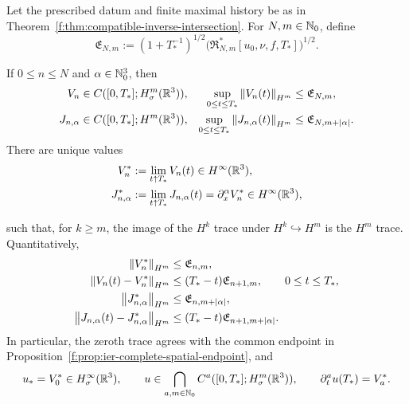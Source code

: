\begin{theorem}
\label{f:thm:ier-compatible-endpoint-traces}
Let the prescribed datum and finite maximal history be as in
Theorem~\ref{f:thm:compatible-inverse-intersection}.
For \(N,m\in\mathbb N_0\), define
\begin{equation}
 \mathfrak E_{N,m}
 :=(1+T_*^{-1})^{1/2}
 \bigl(\mathfrak R_{N,m}^*[u_0,\nu,f,T_*]\bigr)^{1/2}.
 \label{f:eq:ier-endpoint-majorant}
\end{equation}
\begin{samepage}
If \(0\le n\le N\) and \(\alpha\in\mathbb N_0^3\), then
\begin{align}
 V_n&\in C([0,T_*];H^m_\sigma(\mathbb R^3)),
 &\sup_{0\le t\le T_*}\left\lVert V_n(t)\right\rVert_{H^m}
 &\le\mathfrak E_{N,m},
 \label{f:eq:ier-row-trace}\\
 J_{n,\alpha}&\in C([0,T_*];H^m(\mathbb R^3)),
 &\sup_{0\le t\le T_*}\left\lVert J_{n,\alpha}(t)\right\rVert_{H^m}
 &\le\mathfrak E_{N,m+|\alpha|}.
 \label{f:eq:ier-mixed-row-trace}
\end{align}
There are unique values
\begin{align}
 V_n^*&:=\lim_{t\uparrow T_*}V_n(t)
 \in H^\infty(\mathbb R^3),
 \label{f:eq:ier-velocity-endpoint}\\
 J_{n,\alpha}^*&:=\lim_{t\uparrow T_*}J_{n,\alpha}(t)
 =\partial_x^\alpha V_n^*
 \in H^\infty(\mathbb R^3),
 \label{f:eq:ier-mixed-velocity-endpoint}
\end{align}
\par
\end{samepage}
such that, for \(k\ge m\), the image of the \(H^k\) trace under
\(H^k\hookrightarrow H^m\) is the \(H^m\) trace.  Quantitatively,
\begin{align}
 \left\lVert V_n^*\right\rVert_{H^m}
 &\le\mathfrak E_{n,m},
 \label{f:eq:ier-endpoint-velocity-size}\\
 \left\lVert V_n(t)-V_n^*\right\rVert_{H^m}
 &\le(T_*-t)\mathfrak E_{n+1,m},
 \qquad0\le t\le T_*,
 \label{f:eq:ier-endpoint-velocity-modulus}\\
 \left\lVert J_{n,\alpha}^*\right\rVert_{H^m}
 &\le\mathfrak E_{n,m+|\alpha|},
 \label{f:eq:ier-endpoint-mixed-size}\\
 \left\lVert J_{n,\alpha}(t)-J_{n,\alpha}^*\right\rVert_{H^m}
 &\le(T_*-t)\mathfrak E_{n+1,m+|\alpha|}.
 \label{f:eq:ier-endpoint-mixed-modulus}
\end{align}
 In particular, the zeroth trace agrees with the common endpoint in
 Proposition~\ref{f:prop:ier-complete-spatial-endpoint}, and
\begin{equation}
 u_*=V_0^*\in H^\infty_\sigma(\mathbb R^3),
 \qquad
 u\in\bigcap_{a,m\in\mathbb N_0}C^a([0,T_*];H^m_\sigma(\mathbb R^3)),
 \qquad
 \partial_t^au(T_*)=V_a^*.
 \label{f:eq:ier-complete-left-velocity-jet}
\end{equation}
\end{theorem}

